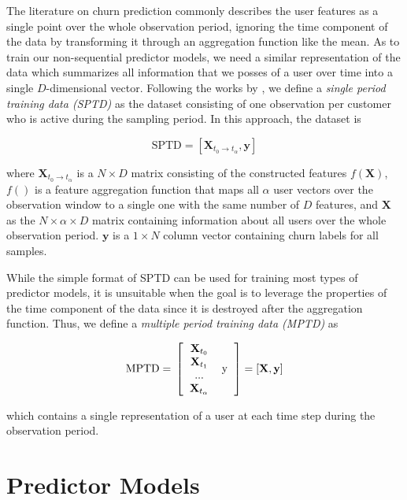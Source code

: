 \documentclass{kththesis}
\begin{document}
The literature on churn prediction commonly describes the user features as a single point over the whole observation period, ignoring the time component of the data by transforming it through an aggregation function like the mean. As to train our non-sequential predictor models, we need a similar representation of the data which summarizes all information that we posses of a user over time into a single $D$-dimensional vector. Following the works by \citep{GurAli2014}, we define a \emph{single period training data (SPTD)} as the dataset consisting of one observation per customer who is active during the sampling period. In this approach, the dataset is 

\begin{equation}
\text{SPTD} = [\mathbf{X}_{t_0 \rightarrow t_\alpha}, \mathbf{y}]
\end{equation}

where $\mathbf{X}_{t_0\rightarrow t_\alpha}$ is a $N \times D$ matrix consisting of the constructed features $f(\mathbf{X})$, $f()$ is a feature aggregation function that maps all $\alpha$ user vectors over the observation window to a single one with the same number of $D$ features, and  $\mathbf{X}$ as the $N \times \alpha \times D$ matrix containing information about all users over the whole observation period. $\mathbf{y}$ is a $1 \times N$ column vector containing churn labels for all samples. 

While the simple format of SPTD can be used for training most types of predictor models, it is unsuitable when the goal is to leverage the properties of the time component of the data since it is destroyed after the aggregation function. Thus, we define a \emph{multiple period training data (MPTD)} as

\begin{equation}
\text{MPTD} = \\
\left [  
  \begin{tabular}{c c}
   $\mathbf{X}_{t_0}$   & \multirow{4}{*}{y} \\
   $\mathbf{X}_{t_1}$ \\
   ... \\
  $\mathbf{X}_{t_\alpha}$ \\
  \end{tabular}
\right ]
= [\mathbf{X}, \mathbf{y}]
\end{equation}

which contains a single representation of a user at each time step during the observation period.

\section{Predictor Models}
\end{document}

